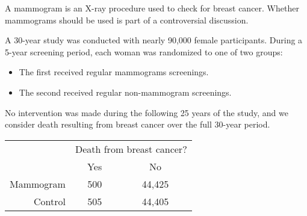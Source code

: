 \documentclass{beamer}
\begin{document}
\begin{frame}
  \begin{example}
    A mammogram is an X-ray procedure used to check for breast cancer. Whether mammograms should be used is part of a controversial discussion.\pause

    \vspace{1mm}
    A 30-year study was conducted with nearly 90,000 female participants. During a 5-year screening period, each woman was randomized to one of two groups:\pause
    \begin{itemize}
    \item The first received regular mammograms screenings.\pause
    \item The second received regular non-mammogram screenings.\pause
    \end{itemize}
    No intervention was made during the following 25 years of the study, and we consider death resulting from breast cancer over the full 30-year period.\pause

    \vspace{-2mm}
    \begin{center}
      \begin{tabular}{rcc}
        &\multicolumn{2}{c}{Death from breast cancer?}\\\cline{2-3}
        & Yes & No \\\hline
        Mammogram & 500 & 44,425 \\
        Control & 505 & 44,405 \\\hline
      \end{tabular}
    \end{center}
  \end{example}
\end{frame}

\newcommand{\pmgm}[0]{p_{\text{mgm}}}
\newcommand{\nmgm}[0]{n_{\text{mgm}}}
\newcommand{\pctrl}[0]{p_{\text{ctrl}}}
\newcommand{\nctrl}[0]{n_{\text{ctrl}}}
\newcommand{\pooled}[0]{\hat{p}_{\text{pooled}}}
\end{document}
